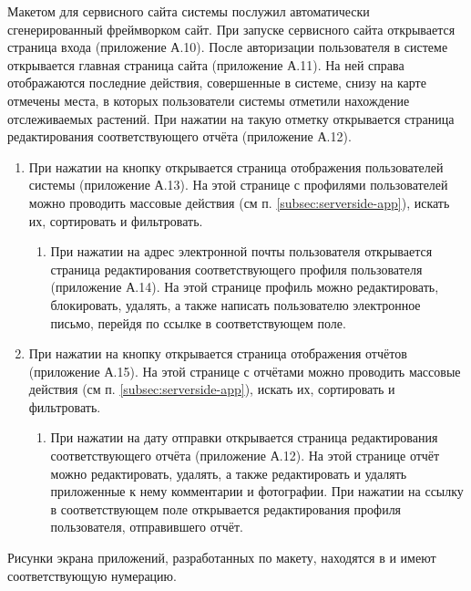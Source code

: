Макетом для сервисного сайта системы послужил автоматически сгенерированный фреймворком  сайт.
При запуске сервисного сайта открывается страница входа (приложение А.10).
После авторизации пользователя в системе открывается главная страница сайта (приложение А.11).
На ней справа отображаются последние действия, совершенные в системе, снизу на карте отмечены места, в которых пользователи системы отметили нахождение отслеживаемых растений.
При нажатии на такую отметку открывается страница редактирования соответствующего отчёта (приложение А.12).
\begin{enumerate}
	\item При нажатии на кнопку  открывается страница отображения пользователей системы (приложение А.13).
	На этой странице с профилями пользователей можно проводить массовые действия (см п. \ref{subsec:serverside-app}), искать их, сортировать и фильтровать.
	\begin{enumerate}
		\item При нажатии на адрес электронной почты пользователя открывается страница редактирования соответствующего профиля пользователя (приложение А.14).
		На этой странице профиль можно редактировать, блокировать, удалять, а также написать пользователю электронное письмо, перейдя по ссылке в соответствующем поле.
	\end{enumerate}
	\item При нажатии на кнопку  открывается страница отображения отчётов (приложение А.15).
	На этой странице с отчётами можно проводить массовые действия (см п. \ref{subsec:serverside-app}), искать их, сортировать и фильтровать.
	\begin{enumerate}
		\item При нажатии на дату отправки открывается страница редактирования соответствующего отчёта (приложение А.12).
		На этой странице отчёт можно редактировать, удалять, а также редактировать и удалять приложенные к нему комментарии и фотографии.
		При нажатии на ссылку в соответствующем поле открывается редактирования профиля пользователя, отправившего отчёт.
	\end{enumerate}
\end{enumerate}

\tab
Рисунки экрана приложений, разработанных по макету, находятся в  и имеют соответствующую нумерацию.
